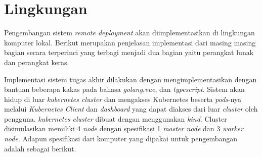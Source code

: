 \section{Lingkungan}

Pengembangan sistem \textit{remote deployment} akan diimplementasikan di lingkungan komputer lokal. Berikut merupakan penjelasan implementasi dari masing masing bagian secara terperinci yang terbagi menjadi dua bagian yaitu perangkat lunak dan perangkat keras.

Implementasi sistem tugas akhir dilakukan dengan mengimplementasikan dengan bantuan beberapa kakas pada bahasa \textit{golang},\textit{vue}, dan \textit{typescript}. Sistem akan hidup di luar \textit{kubernetes cluster} dan mengakses Kubernetes beserta \textit{pods}-nya melalui \textit{Kubernetes Client} dan \textit{dashboard} yang dapat diakses dari luar \textit{cluster} oleh pengguna. \textit{kubernetes cluster} dibuat dengan menggunakan \textit{kind}. Cluster disimulasikan memiliki 4 \textit{node} dengan spesifikasi 1 \textit{master node} dan 3 \textit{worker node}. Adapun spesifikasi dari komputer yang dipakai untuk pengembangan adalah sebagai berikut.
